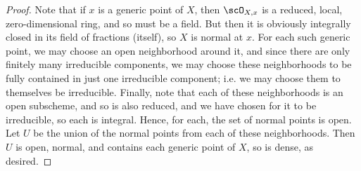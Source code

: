 \begin{proof}
	Note that if $x$ is a generic point of $X$, then $\scO_{X,x}$ is a reduced, local, zero-dimensional ring, and so must be a field. But then it is obviously integrally closed in its field of fractions (itself), so $X$ is normal at $x$. For each such generic point, we may choose an open neighborhood around it, and since there are only finitely many irreducible components, we may choose these neighborhoods to be fully contained in just one irreducible component; i.e. we may choose them to themselves be irreducible. Finally, note that each of these neighborhoods is an open subscheme, and so is also reduced, and we have chosen for it to be irreducible, so each is integral. Hence, for each, the set of normal points is open. Let $U$ be the union of the normal points from each of these neighborhoods. Then $U$ is open, normal, and contains each generic point of $X$, so is dense, as desired.
\end{proof}

